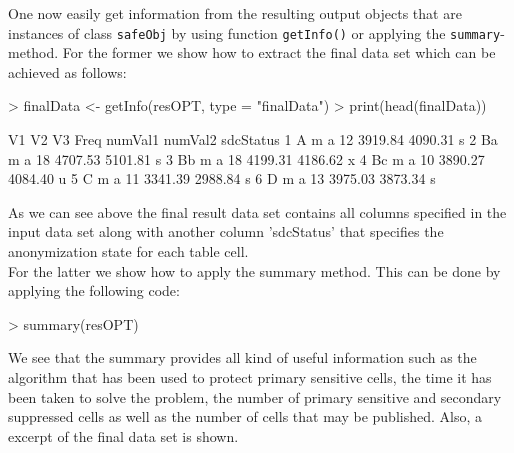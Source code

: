\documentclass{article}
\begin{document}
One now easily get information from the resulting output objects that are instances
of class {\tt safeObj} by using function {\tt getInfo()} or applying the 
{\tt summary}-method. For the former we show how to extract the final data set 
which can be achieved as follows:
\begin{Schunk}
\begin{Sinput}
> finalData <- getInfo(resOPT, type = "finalData")
> print(head(finalData))
\end{Sinput}
\begin{Soutput}
  V1 V2 V3 Freq numVal1 numVal2 sdcStatus
1  A  m  a   12 3919.84 4090.31         s
2 Ba  m  a   18 4707.53 5101.81         s
3 Bb  m  a   18 4199.31 4186.62         x
4 Bc  m  a   10 3890.27 4084.40         u
5  C  m  a   11 3341.39 2988.84         s
6  D  m  a   13 3975.03 3873.34         s
\end{Soutput}
\end{Schunk}
As we can see above the final result data set contains all columns specified in
the input data set along with another column 'sdcStatus' that specifies the
anonymization state for each table cell. \\

For the latter we show how to apply the summary method. This can be done by
applying the following code:
\begin{Schunk}
\begin{Sinput}
> summary(resOPT)
\end{Sinput}
\end{Schunk}
We see that the summary provides all kind of useful information such as the
algorithm that has been used to protect primary sensitive cells, the time it 
has been taken to solve the problem, the number of primary sensitive and 
secondary suppressed cells as well as the number of cells that may be published.
Also, a excerpt of the final data set is shown. \\
\end{document}
